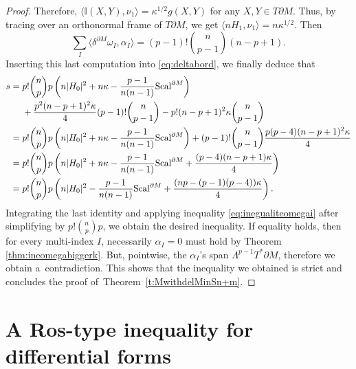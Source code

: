 \documentclass[pdftex]{sigma}
\numberwithin{equation}{section}
\begin{document}
\begin{proof}
Therefore, $\langle \mathbb{I}(X,Y),\nu_1\rangle=\kappa^{1/2} g(X,Y)$ for any $X,Y\in T\partial M$.
Thus, by tracing over an orthonormal frame of $T\partial M$, we get $\langle nH_1,\nu_1\rangle=n\kappa^{1/2}$. Then
\[\sum_I\bigl\langle \delta^{\partial M}\omega_I,\alpha_I\bigr\rangle=(p-1)!\binom{n}{p-1}(n-p+1).\]
Inserting this last computation into \eqref{eq:deltabord}, we finally deduce that
\begin{align*}
s={}&
p!\binom{n}{p}p\left(n|H_0|^2+n\kappa-\frac{p-1}{n(n-1)}{\rm Scal}^{\partial M}\right)\nonumber\\&{}+\frac{p^2(n-p+1)^2\kappa}{4}(p-1)!\binom{n}{p-1}-p!(n-p+1)^2\kappa\binom{n}{p-1}\\
={}& p!\binom{n}{p}p\left(n|H_0|^2+n\kappa-\frac{p-1}{n(n-1)}{\rm Scal}^{\partial M}\right)+(p-1)!\binom{n}{p-1}\frac{p (p-4 )(n-p+1)^2\kappa}{4}\\
={}& p!\binom{n}{p}p\left(n|H_0|^2+n\kappa-\frac{p-1}{n(n-1)}{\rm Scal}^{\partial M}+\frac{(p-4)(n-p+1)\kappa}{4}\right)\\
={}& p!\binom{n}{p}p\left(n|H_0|^2-\frac{p-1}{n(n-1)}{\rm Scal}^{\partial M}+\frac{(np-(p-1)(p-4))\kappa}{4}\right).
\end{align*}
Integrating the last identity and applying inequality \eqref{eq:inegualiteomegai} after simplifying by $p!\binom{n}{p}p$, we obtain the desired i\-ne\-qua\-li\-ty.
If equality holds, then for every multi-index $I$, necessarily $\alpha_I=0$ must hold by Theorem \ref{thm:ineomegabiggerk}.
But, pointwise, the $\alpha_I$'s span $\Lambda^{p-1}T^*\partial M$, therefore we obtain a~contradiction. This shows that the i\-ne\-qua\-li\-ty we obtained is strict and concludes the proof of~Theorem~\ref{t:MwithdelMinSn+m}.
\end{proof}


\section{A Ros-type i\-ne\-qua\-li\-ty for differential forms}\label{s:Rosdiffforms}
\end{document}
